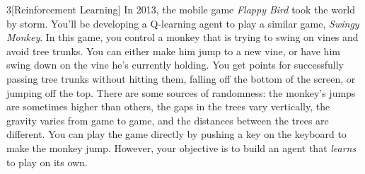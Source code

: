 \documentclass[expanded]{lkx_pset}
\begin{document}
\begin{problem}{3}[Reinforcement Learning]
In 2013, the mobile game \emph{Flappy Bird} took the world by storm. You'll be developing a Q-learning agent to play a similar game, \emph{Swingy Monkey}.  In this game, you control a monkey that is trying to swing on vines and avoid tree trunks.  You can either make him jump to a new vine, or have him swing down on the vine he's currently holding.  You get points for successfully passing tree trunks without hitting them, falling off the bottom of the screen, or jumping off the top.  There are some sources of randomness: the monkey's jumps are sometimes higher than others, the gaps in the trees vary vertically, the gravity varies from game to game, and the distances between the trees are different.  You can play the game directly by pushing a key on the keyboard to make the monkey jump.  However, your objective is to build an agent that \emph{learns} to play on its own.
\end{problem}
\end{document}
